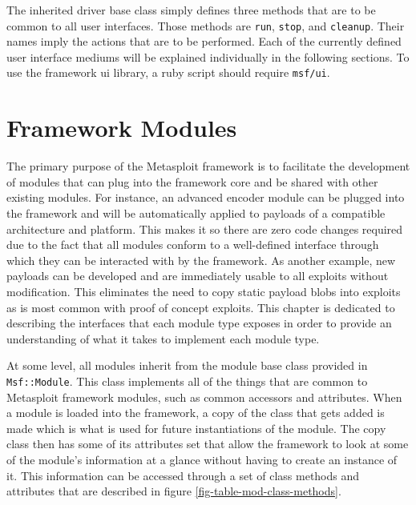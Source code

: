 \documentclass{report}
\begin{document}
\par
The inherited driver base class simply defines three methods that
are to be common to all user interfaces.  Those methods are
\texttt{run}, \texttt{stop}, and \texttt{cleanup}.  Their names
imply the actions that are to be performed.  Each of the currently
defined user interface mediums will be explained individually in the
following sections.  To use the framework ui library, a ruby script
should require \texttt{msf/ui}.

\chapter{Framework Modules}
\label{framework-modules}

\par
The primary purpose of the Metasploit framework is to facilitate the
development of modules that can plug into the framework core and be
shared with other existing modules.  For instance, an advanced
encoder module can be plugged into the framework and will be
automatically applied to payloads of a compatible architecture and
platform.  This makes it so there are zero code changes required due
to the fact that all modules conform to a well-defined interface
through which they can be interacted with by the framework.  As
another example, new payloads can be developed and are immediately
usable to all exploits without modification.  This eliminates the
need to copy static payload blobs into exploits as is most common
with proof of concept exploits.  This chapter is dedicated to
describing the interfaces that each module type exposes in order to
provide an understanding of what it takes to implement each module
type.

\par
At some level, all modules inherit from the module base class
provided in \texttt{Msf::Module}.  This class implements all of the
things that are common to Metasploit framework modules, such as
common accessors and attributes.  When a module is loaded into the
framework, a copy of the class that gets added is made which is what
is used for future instantiations of the module.  The copy class
then has some of its attributes set that allow the framework to look
at some of the module's information at a glance without having to
create an instance of it. This information can be accessed through a
set of class methods and attributes that are described in figure
\ref{fig-table-mod-class-methods}.
\end{document}
